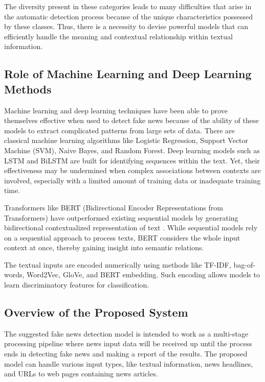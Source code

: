 \documentclass[runningheads]{llncs}
\begin{document}
The diversity present in these categories leads to many difficulties that arise in the automatic detection process because of the unique characteristics possessed by these classes. Thus, there is a necessity to devise powerful models that can efficiently handle the meaning and contextual relationship within textual information.

\subsection{Role of Machine Learning and Deep Learning Methods}

Machine learning and deep learning techniques have been able to prove themselves effective when used to detect fake news because of the ability of these models to extract complicated patterns from large sets of data. There are classical machine learning algorithms like Logistic Regression, Support Vector Machine (SVM), Naive Bayes, and Random Forest.
Deep learning models such as LSTM and BiLSTM are built for identifying sequences within the text. Yet, their effectiveness may be undermined when complex associations between contexts are involved, especially with a limited amount of training data or inadequate training time.

Transformers like BERT (Bidirectional Encoder Representations from Transformers) have outperformed existing sequential models by generating bidirectional contextualized representation of text \cite{Kaliyar2021FakeBERT,Mehta2022RecentTrends}. While sequential models rely on a sequential approach to process texts, BERT considers the whole input context at once, thereby gaining insight into semantic relations.

The textual inputs are encoded numerically using methods like TF-IDF, bag-of-words, Word2Vec, GloVe, and BERT embedding. Such encoding allows models to learn discriminatory features for classification.

\subsection{Overview of the Proposed System}

The suggested fake news detection model is intended to work as a multi-stage processing pipeline where news input data will be received up until the process ends in detecting fake news and making a report of the results. The proposed model can handle various input types, like textual information, news headlines, and URLs to web pages containing news articles.
\end{document}
